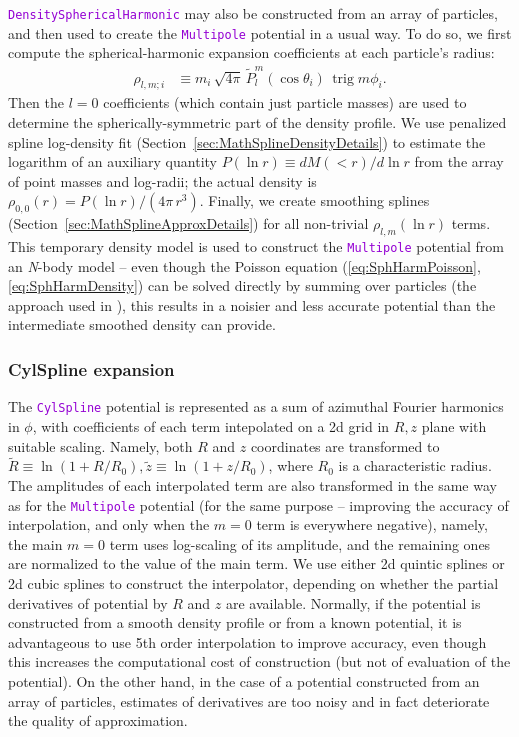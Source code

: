 \documentclass[12pt]{article}
\newcommand{\Nbody}{\textsl{N}-body\xspace}
\newcommand{\ttt}[1]{\textcolor{darkviolet}{\texttt{#1}}}
\DeclareMathOperator{\trig}{trig}
\begin{document}
\ttt{DensitySphericalHarmonic} may also be constructed from an array of particles, and then used to create the \ttt{Multipole} potential in a usual way. To do so, we first compute the spherical-harmonic expansion coefficients at each particle's radius:
\begin{align*}
\rho_{l,m;i} &\equiv m_i\,\sqrt{4\pi}\,\tilde P_l^m(\cos\theta_i)\,\trig m\phi_i .
\end{align*}
Then the $l=0$ coefficients (which contain just particle masses) are used to determine the spherically-symmetric part of the density profile. We use penalized spline log-density fit (Section~\ref{sec:MathSplineDensityDetails}) to estimate the logarithm of an auxiliary quantity $P(\ln r) \equiv dM(<r)/d\ln r$ from the array of point masses and log-radii; the actual density is $\rho_{0,0}(r) = P(\ln r) / (4\pi\,r^3)$. Finally, we create smoothing splines (Section~\ref{sec:MathSplineApproxDetails}) for all non-trivial $\rho_{l,m}(\ln r)$ terms.
This temporary density model is used to construct the \ttt{Multipole} potential from an \Nbody model -- even though the Poisson equation (\ref{eq:SphHarmPoisson},\ref{eq:SphHarmDensity}) can be solved directly by summing over particles (the approach used in \cite{Vasiliev2013}), this results in a noisier and less accurate potential than the intermediate smoothed density can provide.


\subsubsection{CylSpline expansion}  \label{sec:PotentialCylSplineDetails}

The \ttt{CylSpline} potential is represented as a sum of azimuthal Fourier harmonics in $\phi$, with coefficients of each term intepolated on a 2d grid in $R,z$ plane with suitable scaling.
Namely, both $R$ and $z$ coordinates are transformed to $\tilde R \equiv \ln(1+R/R_0), \tilde z \equiv \ln(1+z/R_0)$, where $R_0$ is a characteristic radius. The amplitudes of each interpolated term are also transformed in the same way as for the \ttt{Multipole} potential (for the same purpose -- improving the accuracy of interpolation, and only when the $m=0$ term is everywhere negative), namely, the main $m=0$ term uses log-scaling of its amplitude, and the remaining ones are normalized to the value of the main term. We use either 2d quintic splines or 2d cubic splines to construct the interpolator, depending on whether the partial derivatives of potential by $R$ and $z$ are available. Normally, if the potential is constructed from a smooth density profile or from a known potential, it is advantageous to use 5th order interpolation to improve accuracy, even though this increases the computational cost of construction (but not of evaluation of the potential). On the other hand, in the case of a potential constructed from an array of particles, estimates of derivatives are too noisy and in fact deteriorate the quality of approximation.
\end{document}

